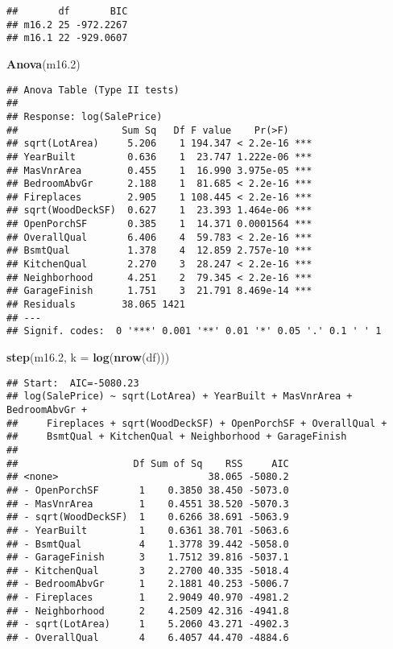 \documentclass[
]{article}
\newenvironment{Shaded}{\begin{snugshade}}{\end{snugshade}}
\newcommand{\AttributeTok}[1]{\textcolor[rgb]{0.13,0.29,0.53}{#1}}
\newcommand{\FloatTok}[1]{\textcolor[rgb]{0.00,0.00,0.81}{#1}}
\newcommand{\FunctionTok}[1]{\textcolor[rgb]{0.13,0.29,0.53}{\textbf{#1}}}
\newcommand{\NormalTok}[1]{#1}
\begin{document}
\begin{verbatim}
##       df       BIC
## m16.2 25 -972.2267
## m16.1 22 -929.0607
\end{verbatim}

\begin{Shaded}
\begin{Highlighting}[]
\FunctionTok{Anova}\NormalTok{(m16}\FloatTok{.2}\NormalTok{)}
\end{Highlighting}
\end{Shaded}

\begin{verbatim}
## Anova Table (Type II tests)
## 
## Response: log(SalePrice)
##                  Sum Sq   Df F value    Pr(>F)    
## sqrt(LotArea)     5.206    1 194.347 < 2.2e-16 ***
## YearBuilt         0.636    1  23.747 1.222e-06 ***
## MasVnrArea        0.455    1  16.990 3.975e-05 ***
## BedroomAbvGr      2.188    1  81.685 < 2.2e-16 ***
## Fireplaces        2.905    1 108.445 < 2.2e-16 ***
## sqrt(WoodDeckSF)  0.627    1  23.393 1.464e-06 ***
## OpenPorchSF       0.385    1  14.371 0.0001564 ***
## OverallQual       6.406    4  59.783 < 2.2e-16 ***
## BsmtQual          1.378    4  12.859 2.757e-10 ***
## KitchenQual       2.270    3  28.247 < 2.2e-16 ***
## Neighborhood      4.251    2  79.345 < 2.2e-16 ***
## GarageFinish      1.751    3  21.791 8.469e-14 ***
## Residuals        38.065 1421                      
## ---
## Signif. codes:  0 '***' 0.001 '**' 0.01 '*' 0.05 '.' 0.1 ' ' 1
\end{verbatim}

\begin{Shaded}
\begin{Highlighting}[]
\FunctionTok{step}\NormalTok{(m16}\FloatTok{.2}\NormalTok{, }\AttributeTok{k =} \FunctionTok{log}\NormalTok{(}\FunctionTok{nrow}\NormalTok{(df)))}
\end{Highlighting}
\end{Shaded}

\begin{verbatim}
## Start:  AIC=-5080.23
## log(SalePrice) ~ sqrt(LotArea) + YearBuilt + MasVnrArea + BedroomAbvGr + 
##     Fireplaces + sqrt(WoodDeckSF) + OpenPorchSF + OverallQual + 
##     BsmtQual + KitchenQual + Neighborhood + GarageFinish
## 
##                    Df Sum of Sq    RSS     AIC
## <none>                          38.065 -5080.2
## - OpenPorchSF       1    0.3850 38.450 -5073.0
## - MasVnrArea        1    0.4551 38.520 -5070.3
## - sqrt(WoodDeckSF)  1    0.6266 38.691 -5063.9
## - YearBuilt         1    0.6361 38.701 -5063.6
## - BsmtQual          4    1.3778 39.442 -5058.0
## - GarageFinish      3    1.7512 39.816 -5037.1
## - KitchenQual       3    2.2700 40.335 -5018.4
## - BedroomAbvGr      1    2.1881 40.253 -5006.7
## - Fireplaces        1    2.9049 40.970 -4981.2
## - Neighborhood      2    4.2509 42.316 -4941.8
## - sqrt(LotArea)     1    5.2060 43.271 -4902.3
## - OverallQual       4    6.4057 44.470 -4884.6
\end{verbatim}
\end{document}
